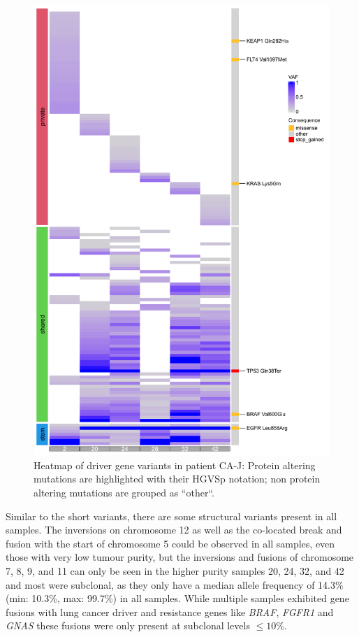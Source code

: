 \begin{figure}[ht]
\centering
\includegraphics[width=.99\linewidth]{Figures/CASCADE/CA80/CA80varHeatmap.pdf}
\caption[Heatmap of driver gene variants in patient CA-J]{Heatmap of driver gene variants in patient CA-J: Protein altering mutations are highlighted with their HGVSp notation; non protein altering mutations are grouped as ``other``.} \label{fig:ca80heatmap}
\end{figure}



Similar to the short variants, there are some structural variants present in all samples. The inversions on chromosome 12 as well as the co-located break and fusion with the start of chromosome 5 could be observed in all samples, even those with very low tumour purity, but the inversions and fusions of chromosome 7, 8, 9, and 11 can only be seen in the higher purity samples 20, 24, 32, and 42 and most were subclonal, as they only have a median allele frequency of 14.3\% (min: 10.3\%, max: 99.7\%) in all samples.
While multiple samples exhibited gene fusions with lung cancer driver and resistance genes like \textit{BRAF}, \textit{FGFR1} and \textit{GNAS} these fusions were only present at subclonal levels $\leq 10\%$.

